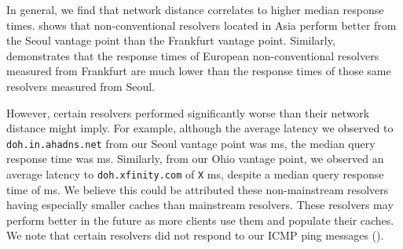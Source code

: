 In general, we find that network distance correlates to higher median response times.
 shows that non-conventional resolvers located in Asia perform better from the Seoul vantage point than the Frankfurt vantage point. 
Similarly,  demonstrates that the response times of European non-conventional resolvers measured from Frankfurt are much lower than the response times of those same resolvers measured from Seoul.

However, certain resolvers performed significantly worse than their network distance might imply.
For example, although the average latency we observed to \texttt{doh.in.ahadns.net} from our Seoul vantage point was  ms, the median query response time was  ms.
Similarly, from our Ohio vantage point, we observed an average latency to \texttt{doh.xfinity.com} of \texttt{X} ms, despite a median query response time of  ms.
We believe this could be attributed these non-mainstream resolvers having especially smaller caches than mainstream resolvers.
These resolvers may perform better in the future as more clients use them and populate their caches.
We note that certain resolvers did not respond to our ICMP ping messages ().

